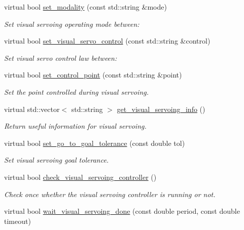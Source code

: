 \begin{DoxyCompactItemize}
virtual bool \hyperlink{classVisualServoingIDL_acf88e08e442c512452efe69f103f8f12}{set\+\_\+modality} (const std\+::string \&mode)
\begin{DoxyCompactList}\small\item\em Set visual servoing operating mode between\+: \end{DoxyCompactList}\item 
virtual bool \hyperlink{classVisualServoingIDL_a3db9d27ad8982f561f44a644897c8a9e}{set\+\_\+visual\+\_\+servo\+\_\+control} (const std\+::string \&control)
\begin{DoxyCompactList}\small\item\em Set visual servo control law between\+: \end{DoxyCompactList}\item 
virtual bool \hyperlink{classVisualServoingIDL_a9b84b61f0d80d9c931e1947a5e86c761}{set\+\_\+control\+\_\+point} (const std\+::string \&point)
\begin{DoxyCompactList}\small\item\em Set the point controlled during visual servoing. \end{DoxyCompactList}\item 
virtual std\+::vector$<$ std\+::string $>$ \hyperlink{classVisualServoingIDL_a9654ec3984d53b41f50e0d70b2991203}{get\+\_\+visual\+\_\+servoing\+\_\+info} ()
\begin{DoxyCompactList}\small\item\em Return useful information for visual servoing. \end{DoxyCompactList}\item 
virtual bool \hyperlink{classVisualServoingIDL_aa465471a7300861c1f991f08eb257694}{set\+\_\+go\+\_\+to\+\_\+goal\+\_\+tolerance} (const double tol)
\begin{DoxyCompactList}\small\item\em Set visual servoing goal tolerance. \end{DoxyCompactList}\item 
virtual bool \hyperlink{classVisualServoingIDL_a6426bda1341487c0dbb1f6a048a45deb}{check\+\_\+visual\+\_\+servoing\+\_\+controller} ()
\begin{DoxyCompactList}\small\item\em Check once whether the visual servoing controller is running or not. \end{DoxyCompactList}\item 
virtual bool \hyperlink{classVisualServoingIDL_aa9c9a265e56b0f85c297d2b7d3c8d9c3}{wait\+\_\+visual\+\_\+servoing\+\_\+done} (const double period, const double timeout)

\end{DoxyCompactItemize}
